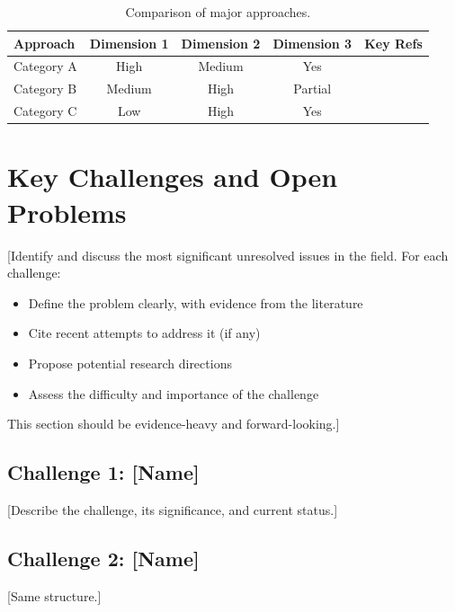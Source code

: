 \documentclass[conference]{IEEEtran}
\begin{document}
\begin{table}[t]
\centering
\caption{Comparison of major approaches.}
\label{tab:comparison}
\begin{tabular}{lcccc}
\toprule
\textbf{Approach} & \textbf{Dimension 1} & \textbf{Dimension 2} & \textbf{Dimension 3} & \textbf{Key Refs} \\
\midrule
Category A \cite{a1} & High & Medium & Yes & \cite{a2,a3} \\
Category B \cite{b1} & Medium & High & Partial & \cite{b2,b3} \\
Category C \cite{c1} & Low & High & Yes & \cite{c2} \\
\bottomrule
\end{tabular}
\end{table}

\section{Key Challenges and Open Problems}
[Identify and discuss the most significant unresolved issues in the field.
For each challenge:
\begin{itemize}
    \item Define the problem clearly, with evidence from the literature
    \item Cite recent attempts to address it (if any)
    \item Propose potential research directions
    \item Assess the difficulty and importance of the challenge
\end{itemize}

This section should be evidence-heavy and forward-looking.]

\subsection{Challenge 1: [Name]}
[Describe the challenge, its significance, and current status.]

\subsection{Challenge 2: [Name]}
[Same structure.]

\end{document}
